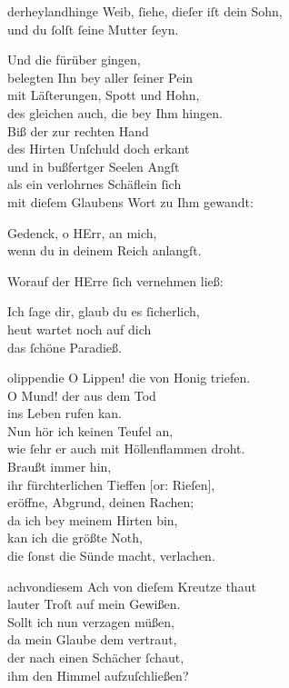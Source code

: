 \documentclass[tocstyle=ref-genre]{ees}
\begin{document}
{\begin{movement}{derheylandhinge}
  Weib, ſiehe, dieſer iſt dein Sohn,\\
  und du ſolſt ſeine Mutter ſeyn.

  Und die fürüber gingen,\\
  belegten Ihn bey aller ſeiner Pein\\
  mit Läſterungen, Spott und Hohn,\\
  des gleichen auch, die bey Ihm hingen.\\
  Biß der zur rechten Hand\\
  des Hirten Unſchuld doch erkant\\
  und in bußfertger Seelen Angſt\\
  als ein verlohrnes Schäflein ſich\\
  mit dieſem Glaubens Wort zu Ihm gewandt:

  Gedenck, o HErr, an mich,\\
  wenn du in deinem Reich anlangſt.

  Worauf der HErre ſich vernehmen ließ:

  Ich ſage dir, glaub du es ſicherlich,\\
  heut wartet noch auf dich\\
  das ſchöne Paradieß.
\end{movement}

\begin{movement}{olippendie}
  O Lippen! die von Honig triefen.\\
  O Mund! der aus dem Tod\\
  ins Leben rufen kan.\\
  Nun hör ich keinen Teufel an,\\
  wie ſehr er auch mit Höllenflammen droht.\\
  Braußt immer hin,\\
  ihr fürchterlichen Tieffen [or: Rieſen],\\
  eröffne, Abgrund, deinen Rachen;\\
  da ich bey meinem Hirten bin,\\
  kan ich die größte Noth,\\
  die ſonst die Sünde macht, verlachen.
\end{movement}

\begin{movement}{achvondiesem}
  Ach von dieſem Kreutze thaut\\
  lauter Troſt auf mein Gewißen.\\
  Sollt ich nun verzagen müßen,\\
  da mein Glaube dem vertraut,\\
  der nach einen Schächer ſchaut,\\
  ihm den Himmel aufzuſchließen?
\end{movement}

}
\end{document}
